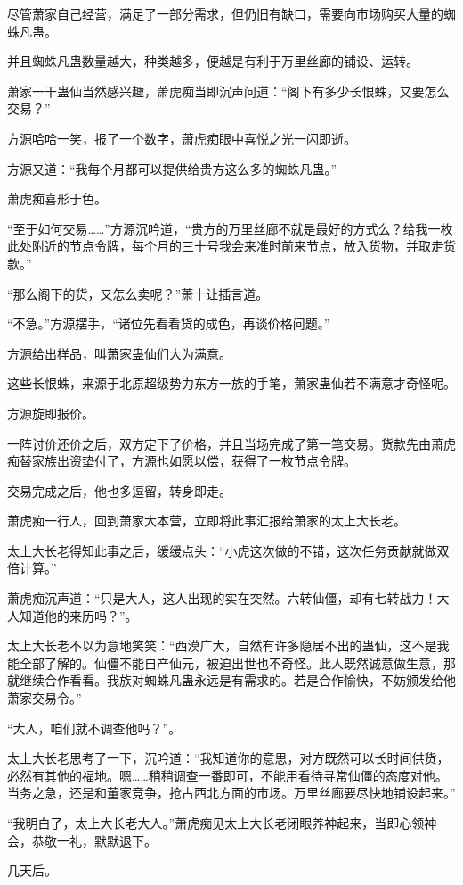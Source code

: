 \begin{this_body}
尽管萧家自己经营，满足了一部分需求，但仍旧有缺口，需要向市场购买大量的蜘蛛凡蛊。

并且蜘蛛凡蛊数量越大，种类越多，便越是有利于万里丝廊的铺设、运转。

萧家一干蛊仙当然感兴趣，萧虎痴当即沉声问道：“阁下有多少长恨蛛，又要怎么交易？”

方源哈哈一笑，报了一个数字，萧虎痴眼中喜悦之光一闪即逝。

方源又道：“我每个月都可以提供给贵方这么多的蜘蛛凡蛊。”

萧虎痴喜形于色。

“至于如何交易……”方源沉吟道，“贵方的万里丝廊不就是最好的方式么？给我一枚此处附近的节点令牌，每个月的三十号我会来准时前来节点，放入货物，并取走货款。”

“那么阁下的货，又怎么卖呢？”萧十让插言道。

“不急。”方源摆手，“诸位先看看货的成色，再谈价格问题。”

方源给出样品，叫萧家蛊仙们大为满意。

这些长恨蛛，来源于北原超级势力东方一族的手笔，萧家蛊仙若不满意才奇怪呢。

方源旋即报价。

一阵讨价还价之后，双方定下了价格，并且当场完成了第一笔交易。货款先由萧虎痴替家族出资垫付了，方源也如愿以偿，获得了一枚节点令牌。

交易完成之后，他也多逗留，转身即走。

萧虎痴一行人，回到萧家大本营，立即将此事汇报给萧家的太上大长老。

太上大长老得知此事之后，缓缓点头：“小虎这次做的不错，这次任务贡献就做双倍计算。”

萧虎痴沉声道：“只是大人，这人出现的实在突然。六转仙僵，却有七转战力！大人知道他的来历吗？”。

太上大长老不以为意地笑笑：“西漠广大，自然有许多隐居不出的蛊仙，这不是我能全部了解的。仙僵不能自产仙元，被迫出世也不奇怪。此人既然诚意做生意，那就继续合作看看。我族对蜘蛛凡蛊永远是有需求的。若是合作愉快，不妨颁发给他萧家交易令。”

“大人，咱们就不调查他吗？”。

太上大长老思考了一下，沉吟道：“我知道你的意思，对方既然可以长时间供货，必然有其他的福地。嗯……稍稍调查一番即可，不能用看待寻常仙僵的态度对他。当务之急，还是和董家竞争，抢占西北方面的市场。万里丝廊要尽快地铺设起来。”

“我明白了，太上大长老大人。”萧虎痴见太上大长老闭眼养神起来，当即心领神会，恭敬一礼，默默退下。

几天后。


\end{this_body}
